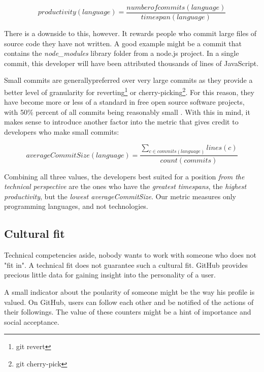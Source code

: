 \begin{equation}
productivity(language) = \frac{numberofcommits(language)}{timespan(language)}
\label{eq:productivity}
\end{equation}

There is a downside to this, however. It rewards people who commit
large files of source code they have not written. A good example might be
a commit that contains the \textit{node\_modules} library folder from a
node.js project. In a single commit, this developer will have been
attributed thousands of lines of JavaScript.

Small commits are generallypreferred \cite{so:commitsize}
over very large commits as they provide a better level of granularity for
reverting\footnote{git revert} or cherry-picking\footnote{git cherry-pick}.
For this reason, they have become more or less of a standard in
free open source software projects, with 50\% percent of all commits
being reasonably small \cite{rsk:2014}.
With this in mind, it makes sense to introduce another factor into
the metric that gives credit to developers who make small commits:

\begin{equation}
averageCommitSize(language) = \frac{\sum_{c \in commits(language)} lines(c)}{count(commits)}
\label {eq:avgcommitsize}
\end{equation}

Combining all three values, the developers best suited for a position
\textit{from the technical perspective} are the ones who
have the \textit{greatest timespans}, the \textit{highest productivity},
but the \textit{lowest averageCommitSize}. Our metric measures only
programming languages, and not technologies.

\subsection{Cultural fit}
Technical competencies aside, nobody wants to work with someone who does
not "fit in". A technical fit does not guarantee such a cultural fit.
GitHub provides precious little data for gaining insight into the
personality of a user.
\newline

A small indicator about the poularity of someone might be the way
his profile is valued. On GitHub, users can follow each other and be
notified of the actions of their followings. The value of these counters
might be a hint of importance and social acceptance.
\newline

